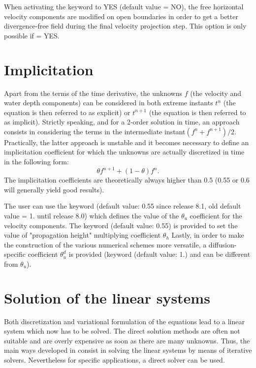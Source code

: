 When activating the keyword  to
YES (default value = NO), the free horizontal velocity components are modified
on open boundaries in order to get a better divergence-free field
during the final velocity projection step.
This option is only possible if  = YES.

\section{Implicitation}

Apart from the terms of the time derivative, the unknowns $f$ (the velocity and
water depth components) can be considered in both extreme instants $t^{n}$ (the
equation is then referred to as explicit) or $t^{n+1}$ (the equation is then
referred to as implicit). Strictly speaking, and for a 2-order solution in
time, an approach consists in considering the terms in the intermediate
instant$(f^{n} +f^{n+1})/2$. Practically, the latter approach is unstable and
it becomes necessary to define an implicitation coefficient for which the
unknowns are actually discretized in time in the following form:
\[\theta f^{n+1} +(1-\theta )f^{n} .\]
The implicitation coefficients are theoretically always higher than 0.5 (0.55
or 0.6 will generally yield good results).

The user can use the keyword  (default
value: 0.55 since release 8.1, old default value = 1. until release 8.0)
which defines the value of the $\theta_{u}$ coefficient for the
velocity components. The keyword  (default
value: 0.55) is provided to set the value of "propagation height" multiplying
coefficient $\theta_{h}$ Lastly, in order to make the construction of the
various numerical schemes more versatile, a diffusion-specific coefficient
$\theta_{u}^{d}$ is provided (keyword 
(default value: 1.) and can be different from $\theta_{u}$).


\section{Solution of the linear systems}

Both discretization and variational formulation of the equations lead to a
linear system which now has to be solved. The direct solution methods are often
not suitable and are overly expensive as soon as there are many unknowns.
Thus, the main ways developed in  consist in solving the linear
systems by means of iterative solvers. Nevertheless for specific applications,
a direct solver can be used.


